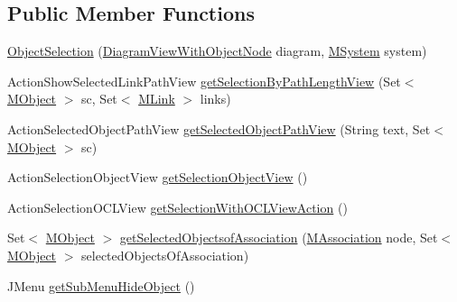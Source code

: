 \subsection*{Public Member Functions}
\begin{DoxyCompactItemize}
\item 
\hyperlink{classorg_1_1tzi_1_1use_1_1gui_1_1views_1_1selection_1_1objectselection_1_1_object_selection_a50856775c02224f392e31a8af61f63e9}{Object\-Selection} (\hyperlink{classorg_1_1tzi_1_1use_1_1gui_1_1views_1_1diagrams_1_1_diagram_view_with_object_node}{Diagram\-View\-With\-Object\-Node} diagram, \hyperlink{classorg_1_1tzi_1_1use_1_1uml_1_1sys_1_1_m_system}{M\-System} system)
\item 
Action\-Show\-Selected\-Link\-Path\-View \hyperlink{classorg_1_1tzi_1_1use_1_1gui_1_1views_1_1selection_1_1objectselection_1_1_object_selection_aa73e76851d5cdce62de9d58fc9769bfa}{get\-Selection\-By\-Path\-Length\-View} (Set$<$ \hyperlink{interfaceorg_1_1tzi_1_1use_1_1uml_1_1sys_1_1_m_object}{M\-Object} $>$ sc, Set$<$ \hyperlink{interfaceorg_1_1tzi_1_1use_1_1uml_1_1sys_1_1_m_link}{M\-Link} $>$ links)
\item 
Action\-Selected\-Object\-Path\-View \hyperlink{classorg_1_1tzi_1_1use_1_1gui_1_1views_1_1selection_1_1objectselection_1_1_object_selection_ac22cd3ae56618e091882efec1a101790}{get\-Selected\-Object\-Path\-View} (String text, Set$<$ \hyperlink{interfaceorg_1_1tzi_1_1use_1_1uml_1_1sys_1_1_m_object}{M\-Object} $>$ sc)
\item 
Action\-Selection\-Object\-View \hyperlink{classorg_1_1tzi_1_1use_1_1gui_1_1views_1_1selection_1_1objectselection_1_1_object_selection_ab588a85d9967ec8d39c585985e4b92c0}{get\-Selection\-Object\-View} ()
\item 
Action\-Selection\-O\-C\-L\-View \hyperlink{classorg_1_1tzi_1_1use_1_1gui_1_1views_1_1selection_1_1objectselection_1_1_object_selection_ad590f045e00e8d730805bf3411168e44}{get\-Selection\-With\-O\-C\-L\-View\-Action} ()
\item 
Set$<$ \hyperlink{interfaceorg_1_1tzi_1_1use_1_1uml_1_1sys_1_1_m_object}{M\-Object} $>$ \hyperlink{classorg_1_1tzi_1_1use_1_1gui_1_1views_1_1selection_1_1objectselection_1_1_object_selection_a8ff07ab30b86b3e01d8932f0703ae80d}{get\-Selected\-Objectsof\-Association} (\hyperlink{interfaceorg_1_1tzi_1_1use_1_1uml_1_1mm_1_1_m_association}{M\-Association} node, Set$<$ \hyperlink{interfaceorg_1_1tzi_1_1use_1_1uml_1_1sys_1_1_m_object}{M\-Object} $>$ selected\-Objects\-Of\-Association)
\item 
J\-Menu \hyperlink{classorg_1_1tzi_1_1use_1_1gui_1_1views_1_1selection_1_1objectselection_1_1_object_selection_a57bbaa4fb861322f98795187f627174f}{get\-Sub\-Menu\-Hide\-Object} ()

\end{DoxyCompactItemize}
